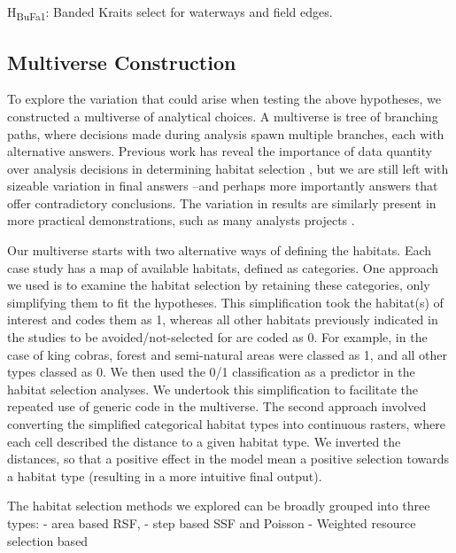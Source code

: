 \documentclass[10pt,a4paper]{article}
\begin{document}
H\textsubscript{BuFa1}: Banded Kraits select for waterways and field edges.

\hypertarget{multiverse-construction}{%
\subsection{Multiverse Construction}\label{multiverse-construction}}

To explore the variation that could arise when testing the above hypotheses, we constructed a multiverse of analytical choices.
A multiverse is tree of branching paths, where decisions made during analysis spawn multiple branches, each with alternative answers.
Previous work has reveal the importance of data quantity over analysis decisions in determining habitat selection , but we are still left with sizeable variation in final answers --and perhaps more importantly answers that offer contradictory conclusions.
The variation in results are similarly present in more practical demonstrations, such as many analysts projects .

Our multiverse starts with two alternative ways of defining the habitats.
Each case study has a map of available habitats, defined as categories.
One approach we used is to examine the habitat selection by retaining these categories, only simplifying them to fit the hypotheses.
This simplification took the habitat(s) of interest and codes them as 1, whereas all other habitats previously indicated in the studies to be avoided/not-selected for are coded as 0.
For example, in the case of king cobras, forest and semi-natural areas were classed as 1, and all other types classed as 0.
We then used the 0/1 classification as a predictor in the habitat selection analyses.
We undertook this simplification to facilitate the repeated use of generic code in the multiverse.
The second approach involved converting the simplified categorical habitat types into continuous rasters, where each cell described the distance to a given habitat type.
We inverted the distances, so that a positive effect in the model mean a positive selection towards a habitat type (resulting in a more intuitive final output).

The habitat selection methods we explored can be broadly grouped into three types:
- area based RSF,
- step based SSF and Poisson
- Weighted resource selection based
\end{document}
